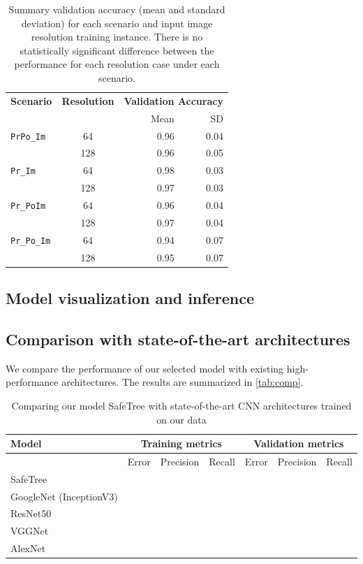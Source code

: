 \documentclass[Journal,letterpaper, SingleSpace, InsideFigs]{ascelike-new}
\begin{document}
\begin{table}[h!]\small
    \centering
    \begin{tabular}{ l c r r}\toprule
\bf Scenario & \bf Resolution & \multicolumn{2}{c}{\bf Validation Accuracy}\\
& & Mean & SD \\\midrule
    \texttt{PrPo\_Im} & 64  & 0.96 & 0.04 \\
                      & 128 & 0.96 & 0.05 \\
    \texttt{Pr\_Im}   & 64  & 0.98 & 0.03 \\
                      & 128 & 0.97 & 0.03 \\
    \texttt{Pr\_PoIm} & 64  & 0.96 & 0.04 \\
                      & 128 & 0.97 & 0.04 \\
    \texttt{Pr\_Po\_Im}& 64  & 0.94 & 0.07 \\
                      & 128 & 0.95 & 0.07 \\ \bottomrule
    \end{tabular}
    \caption{Summary validation accuracy (mean and standard deviation) for each scenario and input image resolution training instance. There is no statistically significant difference between the performance for each resolution case under each scenario.}
    \label{tab:meanvalacc}
\end{table}
\subsection{Model visualization and inference}

\subsection{Comparison with state-of-the-art architectures}
We compare the performance of our selected model with existing high-performance architectures. The results are summarized in \autoref{tab:comp}.

\begin{table}[h!]\small
  \centering
  \begin{tabular}{l l l l l l l }\toprule
    \bf Model & \multicolumn{3}{c}{\bf Training metrics} &\multicolumn{3}{c}{\bf Validation metrics}  \\\midrule
    & Error & Precision & Recall     & Error & Precision & Recall \\
    SafeTree & & & & & & \\
    GoogleNet (InceptionV3) & & & & & & \\
    ResNet50 & & & & & & \\
        VGGNet & & & & & & \\
    AlexNet & & & & & & \\\bottomrule
  \end{tabular}
  \caption{Comparing our model SafeTree with state-of-the-art CNN architectures trained on our data}
  \label{tab:comp}
\end{table}
\end{document}
